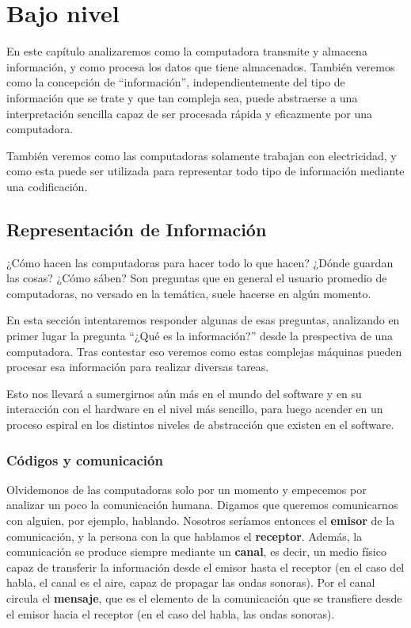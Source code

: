 
\chapter{Bajo nivel}

En este capítulo analizaremos como la computadora transmite y almacena
información, y como procesa los datos que tiene almacenados. También veremos
como la concepción de ``información'', independientemente del tipo de información
que se trate y que tan compleja sea, puede abstraerse a una interpretación
sencilla capaz de ser procesada rápida y eficazmente por una computadora.

También veremos como las computadoras solamente trabajan
con electricidad, y como esta puede ser utilizada para representar todo tipo
de información mediante una codificación.

\section{Representación de Información}

¿Cómo hacen las computadoras para hacer todo lo que hacen? ¿Dónde guardan las
cosas? ¿Cómo sáben? Son preguntas que en general el usuario promedio de
computadoras, no versado en la temática, suele hacerse en algún momento.

En esta sección intentaremos responder algunas de esas preguntas, analizando en
primer lugar la pregunta ``¿Qué es la información?'' desde la prespectiva de una
computadora. Tras contestar eso veremos como estas complejas máquinas pueden
procesar esa información para realizar diversas tareas.

Esto nos llevará a sumergirnos aún más en el mundo del software y en su interacción
con el hardware en el nivel más sencillo, para luego acender en un proceso
espiral en los distintos niveles de abstracción que existen en el software.

\subsection{Códigos y comunicación}

Olvidemonos de las computadoras solo por un momento y empecemos por analizar un
poco la comunicación humana. Digamos que queremos comunicarnos con alguien, por
ejemplo, hablando. Nosotros seríamos entonces el \textbf{emisor} de la comunicación,
y la persona con la que hablamos el \textbf{receptor}. Además, la comunicación se
produce siempre mediante un \textbf{canal}, es decir, un medio físico capaz de
transferir la información desde el emisor hasta el receptor (en el caso del habla,
el canal es el aire, capaz de propagar las ondas sonoras). Por el canal
circula el \textbf{mensaje}, que es el elemento de la comunicación que se transfiere
desde el emisor hacia el receptor (en el caso del habla, las ondas sonoras).

